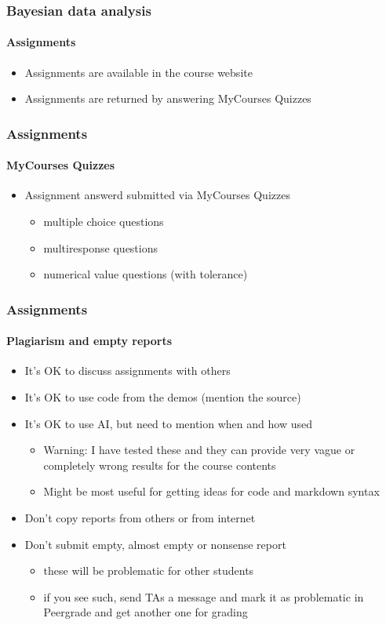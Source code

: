 \documentclass[english,t]{beamer}
\begin{document}
\begin{frame}
  \frametitle{Bayesian data analysis}  %
  \framesubtitle{Assignments}
  \begin{itemize}
  \item Assignments are available in the course website
  \item Assignments are returned by answering MyCourses Quizzes
  \end{itemize}
\end{frame}

\begin{frame}
  \frametitle{Assignments}  %
  \framesubtitle{MyCourses Quizzes}
  \begin{itemize}
  \item Assignment answerd submitted via MyCourses Quizzes
    \begin{itemize}
    \item multiple choice questions
    \item multiresponse questions
    \item numerical value questions (with tolerance)
    \end{itemize}
  \end{itemize}
\end{frame}


\begin{frame}
  \frametitle{Assignments}  %
  \framesubtitle{Plagiarism and empty reports}
  \begin{itemize}
  \item It's OK to discuss assignments with others
  \item It's OK to use code from the demos (mention the source)
  \item It's OK to use AI, but need to mention when and how used
    \begin{itemize}
    \item Warning: I have tested these and they can provide very vague
      or completely wrong results for the course contents
    \item Might be most useful for getting ideas for code and markdown syntax
    \end{itemize}
  \item Don't copy reports from others or from internet
  \item Don't submit empty, almost empty or nonsense report
    \begin{itemize}
    \item these will be problematic for other students
    \item if you see such, send TAs a message and mark it as
      problematic in Peergrade and get another one for grading
    \end{itemize}
  \end{itemize}
  
\end{frame}
\end{document}
